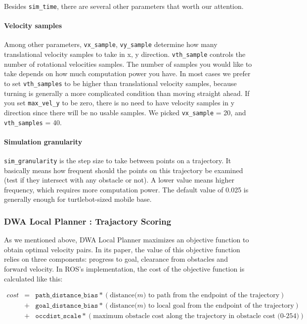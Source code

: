 \documentclass[12pt]{article}
\begin{document}
Besides \texttt{sim\_time}, there are several other parameters that worth our attention.
\paragraph{Velocity samples}
Among other parameters, \texttt{vx\_sample}, \texttt{vy\_sample} determine how many translational velocity samples to take in x, y direction. \texttt{vth\_sample} controls the number of rotational velocities samples. The number of samples you would like to take depends on how much computation power you have. In most cases we prefer to set \texttt{vth\_samples} to
be higher than translational velocity samples, because turning is generally a more complicated condition than moving straight ahead. If you set \texttt{max\_vel\_y} to be zero,
there is no need to have velocity samples in y direction since there will be no usable samples. We picked \texttt{vx\_sample} = 20, and \texttt{vth\_samples} = 40.

\paragraph{Simulation granularity}
\texttt{sim\_granularity} is the step size to take between points on a trajectory. It basically means how frequent should the points on this trajectory be examined (test if they intersect with any obstacle or not). A lower value means higher frequency, which requires more computation power. The default value of 0.025 is generally enough for turtlebot-sized mobile base.

\subsubsection{DWA Local Planner : Trajactory Scoring}

As we mentioned above, DWA Local Planner maximizes an objective function to obtain optimal velocity pairs. In its paper, the value of this objective function relies on three
components: progress to goal, clearance from obstacles and forward velocity. In ROS's implementation, the cost of the objective function is calculated like this:

\footnotesize
\begin{eqnarray*}
    cost &=& \texttt{path\_distance\_bias} * (\text{distance($m$) to path from the endpoint of the trajectory})\\
    &+& \texttt{goal\_distance\_bias} * (\text{distance($m$) to local goal from the endpoint of the trajectory})\\
    &+& \texttt{occdist\_scale} * (\text{maximum obstacle cost along the trajectory in obstacle cost (0-254)})
\end{eqnarray*}
\end{document}
